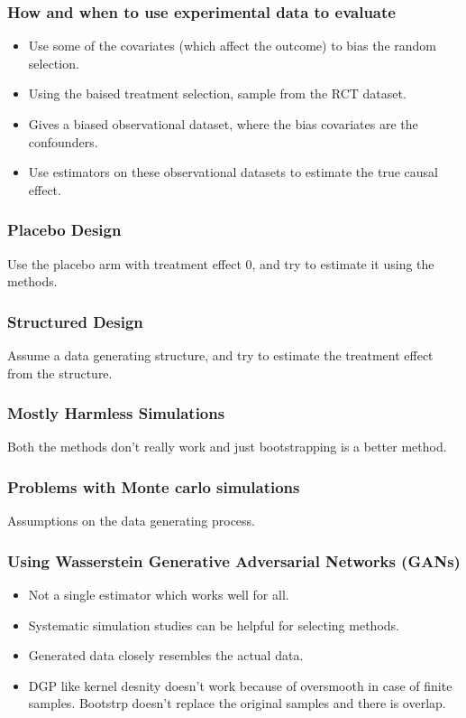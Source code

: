 \documentclass{beamer}
\begin{document}
\begin{frame}
	\frametitle{How and when to use experimental data to evaluate}
	\begin{itemize}
		\item Use some of the covariates (which affect the outcome) to bias the random
			selection.
		\item Using the baised treatment selection, sample from the RCT dataset.
		\item Gives a biased observational dataset, where the bias covariates are the 
			confounders.
		\item Use estimators on these observational datasets to estimate the true 
			causal effect.
	\end{itemize}
\end{frame}

\begin{frame}
	\frametitle{Placebo Design}
	Use the placebo arm with treatment effect 0, and try to estimate it using the methods.
\end{frame}

\begin{frame}
	\frametitle{Structured Design}
	Assume a data generating structure, and try to estimate the treatment effect from the structure.
\end{frame}

\begin{frame}
	\frametitle{Mostly Harmless Simulations}
	Both the methods don't really work and just bootstrapping is a better method.
\end{frame}

\begin{frame}
	\frametitle{Problems with Monte carlo simulations}
	\begin{itemize}
		Assumptions on the data generating process.
	\end{itemize}
\end{frame}

\begin{frame}
	\frametitle{Using Wasserstein Generative Adversarial Networks (GANs)}
	\begin{itemize}
		\item Not a single estimator which works well for all.
		\item Systematic simulation studies can be helpful for selecting methods.
		\item Generated data closely resembles the actual data.
		\item DGP like kernel desnity doesn't work because of oversmooth in case of finite samples. Bootstrp doesn't replace the original samples and there is overlap.
	\end{itemize}
\end{frame}
\end{document}
